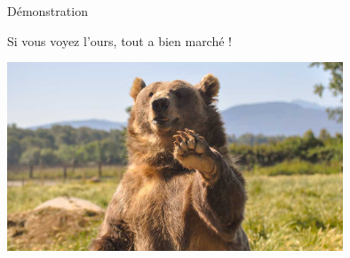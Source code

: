 \begin{frame}{Démonstration}
    \pause
    \begin{block}{}
        Si vous voyez l'ours, tout a bien marché ! 
    \end{block}
        \includegraphics[width=10cm]{img/bear.jpg}
\end{frame}
